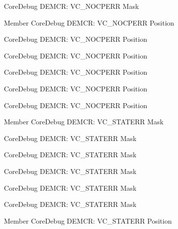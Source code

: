 \begin{DoxyRefList}
\label{deprecated__deprecated000066}%
%
Core\+Debug DEMCR\+: VC\+\_\+\+NOCPERR Mask  
\item[Member \doxylink{group__CMSIS__CoreDebug_gac9d13eb2add61f610d5ced1f7ad2adf8}{Core\+Debug\+\_\+\+DEMCR\+\_\+\+VC\+\_\+\+NOCPERR\+\_\+\+Pos} ]\label{deprecated__deprecated000618}%
%
Core\+Debug DEMCR\+: VC\+\_\+\+NOCPERR Position 

\label{deprecated__deprecated000516}%
%
Core\+Debug DEMCR\+: VC\+\_\+\+NOCPERR Position 

\label{deprecated__deprecated000065}%
%
Core\+Debug DEMCR\+: VC\+\_\+\+NOCPERR Position 

\label{deprecated__deprecated000427}%
%
Core\+Debug DEMCR\+: VC\+\_\+\+NOCPERR Position 

\label{deprecated__deprecated000209}%
%
Core\+Debug DEMCR\+: VC\+\_\+\+NOCPERR Position 

\label{deprecated__deprecated000351}%
%
Core\+Debug DEMCR\+: VC\+\_\+\+NOCPERR Position  
\item[Member \doxylink{group__CMSIS__CoreDebug_gaa38b947d77672c48bba1280c0a642e19}{Core\+Debug\+\_\+\+DEMCR\+\_\+\+VC\+\_\+\+STATERR\+\_\+\+Msk} ]\label{deprecated__deprecated000206}%
%
Core\+Debug DEMCR\+: VC\+\_\+\+STATERR Mask 

\label{deprecated__deprecated000615}%
%
Core\+Debug DEMCR\+: VC\+\_\+\+STATERR Mask 

\label{deprecated__deprecated000062}%
%
Core\+Debug DEMCR\+: VC\+\_\+\+STATERR Mask 

\label{deprecated__deprecated000348}%
%
Core\+Debug DEMCR\+: VC\+\_\+\+STATERR Mask 

\label{deprecated__deprecated000424}%
%
Core\+Debug DEMCR\+: VC\+\_\+\+STATERR Mask 

\label{deprecated__deprecated000513}%
%
Core\+Debug DEMCR\+: VC\+\_\+\+STATERR Mask  
\item[Member \doxylink{group__CMSIS__CoreDebug_ga16f0d3d2ce1e1e8cd762d938ac56c4ac}{Core\+Debug\+\_\+\+DEMCR\+\_\+\+VC\+\_\+\+STATERR\+\_\+\+Pos} ]\label{deprecated__deprecated000061}%
%
Core\+Debug DEMCR\+: VC\+\_\+\+STATERR Position 


\end{DoxyRefList}
